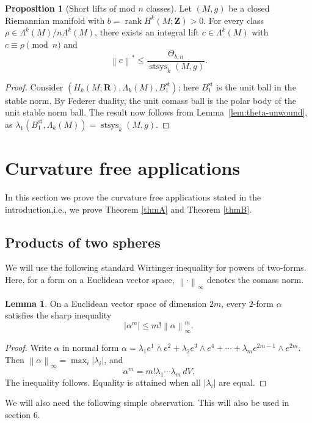 \documentclass[11pt,reqno]{amsart}
\numberwithin{equation}{section}
\numberwithin{equation}{section}
\theoremstyle{definition}
\newtheorem{proposition}[theorem]{Proposition}
\newtheorem{lemma}[theorem]{Lemma}
\newcommand{\R}{\mathbf R}
\newcommand{\Z}{\mathbf Z}
\DeclareMathOperator{\stsys}{stsys}
\DeclareMathOperator{\rank}{rank}
\newcommand{\norm}[1]{\left\lVert #1\right\rVert}
\begin{document}
\begin{proposition}[Short lifts of mod \(n\) classes]\label{lem:basic-lift}
Let \((M,g)\) be a closed Riemannian manifold with \(b=\rank H^k(M;\Z)>0\). For every class \(\rho\in\Lambda^k(M)/n\Lambda^k(M)\), there exists an integral lift \(c\in\Lambda^k(M)\) with \(c\equiv\rho\pmod n\) and
\[
\norm{c}^{\ast}
\le
\frac{\Theta_{b,n}}{\stsys_k(M,g)}.
\]
\end{proposition}

\begin{proof}
Consider $(H_k(M;\R), \Lambda_k(M), B_1^{\mathrm st})$; here $B_1^{\mathrm{st}}$ is the unit ball in the stable norm. By Federer duality, the unit comass ball is the polar body of the unit stable norm ball. The result now follows from Lemma~\ref{lem:theta-unwound}, as $\lambda_1(B_1^{\mathrm{st}}, \Lambda_k(M)) = \stsys_k(M,g)$.
\end{proof}





\section{Curvature free applications}
\label{sec:curvature-free}

In this section we prove the curvature free applications stated in the introduction,i.e., we prove Theorem \ref{thmA} and Theorem \ref{thmB}.

\subsection{Products of two spheres}

We will use the following standard Wirtinger inequality for powers of two-forms. Here, for a form on a Euclidean vector space, \(\norm{\cdot}_\infty\) denotes the comass norm.

\begin{lemma}\label{lem:wirt-two}
On a Euclidean vector space of dimension \(2m\), every \(2\)-form \(\alpha\) satisfies the sharp inequality
\[
|\alpha^m|
\le
m!\norm{\alpha}_{\infty}^m.
\]
\end{lemma}

\begin{proof}
Write \(\alpha\) in normal form \(\alpha
=
\lambda_1 e^1\wedge e^2
+
\lambda_2 e^3\wedge e^4
+
\cdots+
\lambda_m e^{2m-1}\wedge e^{2m}.\)
Then \(\norm{\alpha}_{\infty}=\max_i|\lambda_i|\), and
\[
\alpha^m=m!\lambda_1\cdots\lambda_m\,dV.
\]
The inequality follows. Equality is attained when all \(|\lambda_i|\) are equal.
\end{proof}
We will also need the following simple observation. This will also be used in section 6. 
\end{document}
